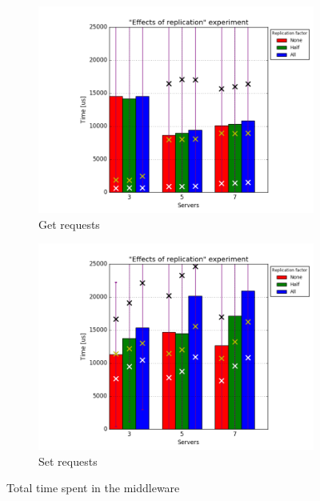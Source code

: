 \documentclass[11pt]{article}
\begin{document}
\begin{figure}
\centering
\begin{subfigure}{.5\textwidth}
	\centering
	\includegraphics[width=\linewidth]{plots/replication-get-scaled}
	\caption{Get requests}
\end{subfigure}%
\begin{subfigure}{.5\textwidth}
	\centering
	\includegraphics[width=\linewidth]{plots/replication-set-scaled}
	\caption{Set requests}
\end{subfigure}
\caption{Total time spent in the middleware}
\label{fig:replication-set-get}
\end{figure}
\end{document}
